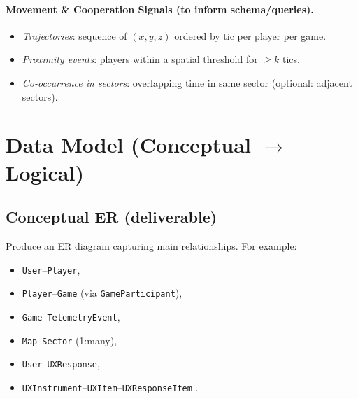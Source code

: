 \documentclass[11pt]{article}
\begin{document}
\paragraph{Movement \& Cooperation Signals (to inform schema/queries).}
\begin{itemize}[leftmargin=*]
  \item \emph{Trajectories}: sequence of $(x,y,z)$ ordered by tic per player per game.
  \item \emph{Proximity events}: players within a spatial threshold for $\geq k$ tics.
  \item \emph{Co-occurrence in sectors}: overlapping time in same sector (optional:
  adjacent sectors).
\end{itemize}

\section{Data Model (Conceptual $\rightarrow$ Logical)}

\subsection*{Conceptual ER (deliverable)}
Produce an ER diagram capturing main relationships.  For example:

  \begin{itemize}
    \item \texttt{User}--\texttt{Player},
    \item \texttt{Player}--\texttt{Game} (via \texttt{GameParticipant}),
    \item \texttt{Game}--\texttt{TelemetryEvent},
    \item \texttt{Map}--\texttt{Sector} (1:many),
    \item \texttt{User}--\texttt{UXResponse},
    \item \texttt{UXInstrument}--\texttt{UXItem}--\texttt{UXResponseItem} .
  \end{itemize}
\end{document}
